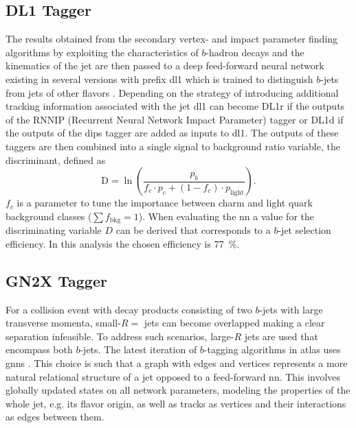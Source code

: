 \subsection{DL1 Tagger}\label{sec:dl1}
The results obtained from the secondary vertex- and impact parameter finding algorithms by exploiting the characteristics of $b$-hadron decays and the kinematics of the jet are then passed to a deep feed-forward neural network existing in several versions with prefix \ac{dl1} which is trained to distinguish $b$-jets from jets of other flavors \citep{atlas2022atlas}. 
Depending on the strategy of introducing additional tracking information associated with the jet \ac{dl1} can become DL1r if the outputs of the RNNIP (Recurrent Neural Network Impact Parameter) \citep{Gilles:2806947} tagger or DL1d if the outputs of the \ac{dips} \citep{ATL-PHYS-PUB-2020-014} tagger are added as inputs to \ac{dl1}. The outputs of these taggers are then combined into a single signal to background ratio variable, the discriminant, defined as
\begin{equation}
  \mathrm{D}=\ln\left(\frac{p_b}{f_c \cdot p_c + (1-f_c)\cdot p_\mathrm{light} }\right).
\end{equation}
$f_c$ is a parameter to tune the importance between charm and light quark background classes ($\sum f_\mathrm{bkg} =1$). When evaluating the \ac{nn} a value for the discriminating variable $D$ can be derived that corresponds to a $b$-jet selection efficiency. In this analysis the chosen efficiency is \qty[]{77}{\percent}. 

\subsection{GN2X Tagger}\label{sec:gn2x}
For a collision event with decay products consisting of two $b$-jets with large transverse momenta, small-$R=$ jets can become overlapped making a clear separation infeasible. To address such scenarios, large-$R$ jets are used that encompass both $b$-jets. The latest iteration of $b$-tagging algorithms in \ac{atlas} uses \acp{gnn} \citep{shlomi2020graph, ATL-PHYS-PUB-2022-027}. This choice is such that a graph with edges and vertices represents a more natural relational structure of a jet opposed to a feed-forward \ac{nn}. This involves globally updated states on all network parameters, modeling the properties of the whole jet, e.g. its flavor origin, as well as tracks as vertices and their interactions as edges between them. 

